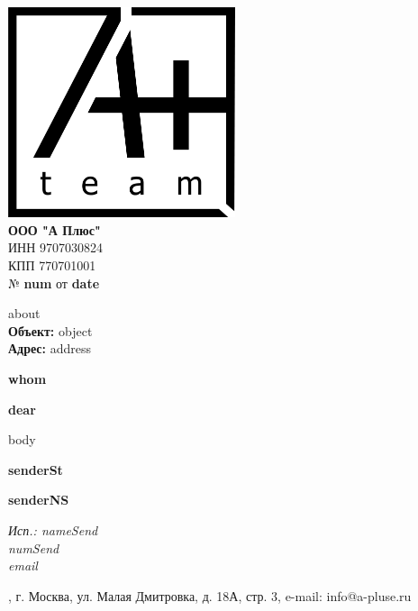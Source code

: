 \documentclass[a4paper,12pt]{letter}
\begin{document}
\noindent
\begin{minipage}[t]{0.5\textwidth}
    \vspace{0pt} %
    \includegraphics[width=0.5\textwidth]{A.png} \\ %
    \textbf{ООО "А Плюс"} \\
    ИНН 9707030824 \\
    КПП 770701001 \\
    № \textbf{ {{num}} } от \textbf{ {{date}} } \\
\end{minipage}%

\begin{minipage}[t]{0.5\textwidth} 
    {{about}} \\
    \textbf{Объект:} {{object}} \\
    \textbf{Адрес:} {{address}}
\end{minipage}%
\begin{minipage}[t]{0.5\textwidth}
    \raggedleft
    \bfseries
    {{whom}}
\end{minipage}

\vspace{1cm}

\begin{center}
    \textbf{ {{dear}} }
\end{center}


\vspace{0.5cm}

\begin{minipage}[t]{\textwidth}
    \raggedright
    {{body}}

\end{minipage}

\vspace{1cm}


\begin{minipage}[t]{0.4\textwidth}
    \textbf{ {{senderSt}} }
\end{minipage}%
\begin{minipage}[t]{0.2\textwidth}
    \centering
    \underline{\hspace{5cm}}
\end{minipage}%
\begin{minipage}[t]{0.4\textwidth}
    \raggedleft
    \textbf{ {{senderNS}} }
\end{minipage}


\vfill

\noindent
\itshape
Исп.: {{nameSend}} \\
{{numSend}} \\
{{email}}

\noindent\makebox[\linewidth]{\rule{1\paperwidth}{0.4pt}}
\noindent
\centering
\fontsize{9}{10}, г. Москва, ул. Малая Дмитровка, д. 18А, стр. 3, e-mail: info@a-pluse.ru
\end{document}
